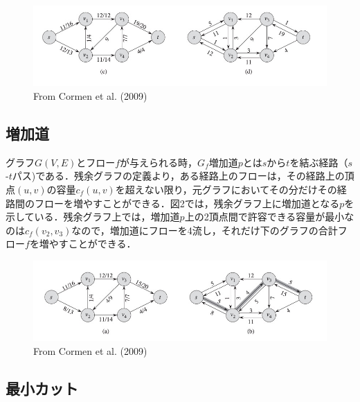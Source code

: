 \documentclass[
]{ltjarticle}
\begin{document}
\begin{figure}
\centering
\includegraphics[width=\textwidth]{residual_graph.jpg}
\caption{From Cormen et al. (2009)}
\end{figure}

\hypertarget{ux5897ux52a0ux9053}{%
\subsection{増加道}\label{ux5897ux52a0ux9053}}

グラフ\(G(V, E)\)とフロー\(f\)が与えられる時，\(G_f\)増加道\(p\)とは\(s\)から\(t\)を結ぶ経路（\(s\)-\(t\)パス)である．残余グラフの定義より，ある経路上のフローは，その経路上の頂点\((u,v)\)の容量\(c_f(u,v)\)を超えない限り，元グラフにおいてその分だけその経路間のフローを増やすことができる．図2では，残余グラフ上に増加道となる\(p\)を示している．残余グラフ上では，増加道\(p\)上の2頂点間で許容できる容量が最小なのは\(c_f(v_2, v_3)\)なので，増加道にフローを4流し，それだけ下のグラフの合計フロー\(f\)を増やすことができる．

\begin{figure}
\centering
\includegraphics[width=\textwidth]{augmented_path.jpg}
\caption{From Cormen et al. (2009)}
\end{figure}

\hypertarget{ux6700ux5c0fux30abux30c3ux30c8}{%
\subsection{最小カット}\label{ux6700ux5c0fux30abux30c3ux30c8}}
\end{document}
